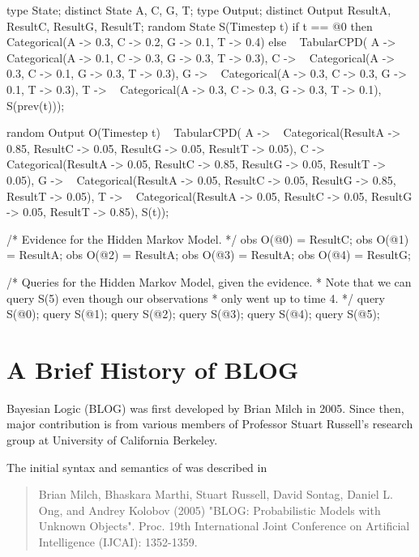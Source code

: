 \documentclass[12pt]{article}
\begin{document}
\begin{blogcode}
type State;
distinct State A, C, G, T;
type Output;
distinct Output ResultA, ResultC, ResultG, ResultT;
random State S(Timestep t)
  if t == @0 then 
    ~ Categorical({A -> 0.3, C -> 0.2, G -> 0.1, T -> 0.4})
  else ~ TabularCPD(
    {A -> ~ Categorical({A -> 0.1, C -> 0.3, G -> 0.3, T -> 0.3}),
     C -> ~ Categorical({A -> 0.3, C -> 0.1, G -> 0.3, T -> 0.3}),
     G -> ~ Categorical({A -> 0.3, C -> 0.3, G -> 0.1, T -> 0.3}),
     T -> ~ Categorical({A -> 0.3, C -> 0.3, G -> 0.3, T -> 0.1})},
    S(prev(t)));

random Output O(Timestep t)
  ~ TabularCPD(
    {A -> ~ Categorical({ResultA -> 0.85, ResultC -> 0.05,
                         ResultG -> 0.05, ResultT -> 0.05}),
    C -> ~ Categorical({ResultA -> 0.05, ResultC -> 0.85, 
                        ResultG -> 0.05, ResultT -> 0.05}),
    G -> ~ Categorical({ResultA -> 0.05, ResultC -> 0.05, 
                        ResultG -> 0.85, ResultT -> 0.05}),
    T -> ~ Categorical({ResultA -> 0.05, ResultC -> 0.05, 
                        ResultG -> 0.05, ResultT -> 0.85})},
    S(t));

/* Evidence for the Hidden Markov Model.
 */
obs O(@0) = ResultC;
obs O(@1) = ResultA;
obs O(@2) = ResultA;
obs O(@3) = ResultA;
obs O(@4) = ResultG;

/* Queries for the Hidden Markov Model, given the evidence.  
 * Note that we can query S(5) even though our observations 
 * only went up to time 4.
 */
query S(@0);
query S(@1);
query S(@2);
query S(@3);
query S(@4);
query S(@5);
\end{blogcode}

\appendix

{}


\section{A Brief  History of BLOG}\label{history-appendix}
Bayesian Logic (BLOG) was first developed by Brian Milch in 2005. Since then, major contribution is from various members of Professor Stuart Russell's research group at University of California Berkeley. 

The initial syntax and semantics of \bl was described in 

\begin{quote}
Brian Milch, Bhaskara Marthi, Stuart Russell, David Sontag, Daniel L. Ong, and Andrey Kolobov (2005) "BLOG: Probabilistic Models with Unknown Objects". Proc. 19th International Joint Conference on Artificial Intelligence (IJCAI): 1352-1359.
\end{quote}
\end{document}
